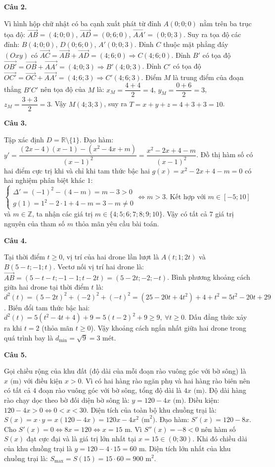 \documentclass[12pt,a4paper]{article}
\newcommand{\loigiai}[1]{\par\medskip\Needspace{4\baselineskip}\noindent\textbf{#1}\par\nobreak}
\begin{document}
\loigiai{Câu 2.}
Vì hình hộp chữ nhật có ba cạnh xuất phát từ đỉnh $A(0;0;0)$ nằm trên ba trục tọa độ:
$\vec{AB}=(4;0;0)$, $\vec{AD}=(0;6;0)$, $\vec{AA'}=(0;0;3)$.
Suy ra tọa độ các đỉnh:
$B(4;0;0)$, $D(0;6;0)$, $A'(0;0;3)$.
Đỉnh $C$ thuộc mặt phẳng đáy $(Oxy)$ có $\vec{AC}=\vec{AB}+\vec{AD}=(4;6;0)\Rightarrow C(4;6;0)$.
Đỉnh $B'$ có tọa độ $\vec{OB'}=\vec{OB}+\vec{AA'}=(4;0;3)\Rightarrow B'(4;0;3)$.
Đỉnh $C'$ có tọa độ $\vec{OC'}=\vec{OC}+\vec{AA'}=(4;6;3)\Rightarrow C'(4;6;3)$.
Điểm $M$ là trung điểm của đoạn thẳng $B'C'$ nên tọa độ của $M$ là:
$x_M=\dfrac{4+4}{2}=4$, $y_M=\dfrac{0+6}{2}=3$, $z_M=\dfrac{3+3}{2}=3$.
Vậy $M(4;3;3)$, suy ra $T=x+y+z=4+3+3=10$.

\loigiai{Câu 3.}
Tập xác định $D=\mathbb{R}\setminus\{1\}$.
Đạo hàm:
$y'=\dfrac{(2x-4)(x-1)-(x^2-4x+m)}{(x-1)^2}=\dfrac{x^2-2x+4-m}{(x-1)^2}$.
Đồ thị hàm số có hai điểm cực trị khi và chỉ khi tam thức bậc hai $g(x)=x^2-2x+4-m=0$ có hai nghiệm phân biệt khác $1$:
$\begin{cases}\Delta'=(-1)^2-(4-m)=m-3>0\\ g(1)=1^2-2\cdot 1+4-m=3-m\ne 0\end{cases}\Leftrightarrow m>3$.
Kết hợp với $m\in[-5;10]$ và $m\in\mathbb{Z}$, ta nhận các giá trị $m\in\{4;5;6;7;8;9;10\}$.
Vậy có tất cả $7$ giá trị nguyên của tham số $m$ thỏa mãn yêu cầu bài toán.

\loigiai{Câu 4.}
Tại thời điểm $t\ge 0$, vị trí của hai drone lần lượt là $A(t;1;2t)$ và $B(5-t;-1;t)$.
Vectơ nối vị trí hai drone là:
$\vec{AB}=(5-t-t;-1-1;t-2t)=(5-2t;-2;-t)$.
Bình phương khoảng cách giữa hai drone tại thời điểm $t$ là:
$d^2(t)=(5-2t)^2+(-2)^2+(-t)^2=(25-20t+4t^2)+4+t^2=5t^2-20t+29$.
Biến đổi tam thức bậc hai:
$d^2(t)=5(t^2-4t+4)+9=5(t-2)^2+9\ge 9,\ \forall t\ge 0$.
Dấu đẳng thức xảy ra khi $t=2$ (thỏa mãn $t\ge 0$).
Vậy khoảng cách ngắn nhất giữa hai drone trong quá trình bay là $d_{\min}=\sqrt{9}=3\text{ mét}$.

\loigiai{Câu 5.}
Gọi chiều rộng của khu đất (độ dài của mỗi đoạn rào vuông góc với bờ sông) là $x\text{ (m)}$ với điều kiện $x>0$.
Vì có hai hàng rào ngăn phụ và hai hàng rào biên nên có tất cả $4$ đoạn rào vuông góc với bờ sông, tổng độ dài là $4x\text{ (m)}$.
Độ dài hàng rào chạy dọc theo bờ đối diện bờ sông là:
$y=120-4x\text{ (m)}$.
Điều kiện: $120-4x>0\Leftrightarrow 0<x<30$.
Diện tích của toàn bộ khu chuồng trại là:
$S(x)=x\cdot y=x(120-4x)=120x-4x^2\text{ (m}^2\text{)}$.
Đạo hàm: $S'(x)=120-8x$.
Cho $S'(x)=0\Leftrightarrow 8x=120\Leftrightarrow x=15\text{ m}$.
Vì $S''(x)=-8<0$ nên hàm số $S(x)$ đạt cực đại và là giá trị lớn nhất tại $x=15\in(0;30)$.
Khi đó chiều dài của khu chuồng trại là $y=120-4\cdot 15=60\text{ m}$.
Diện tích lớn nhất của khu chuồng trại là:
$S_{\max}=S(15)=15\cdot 60=900\text{ m}^2$.
\end{document}
